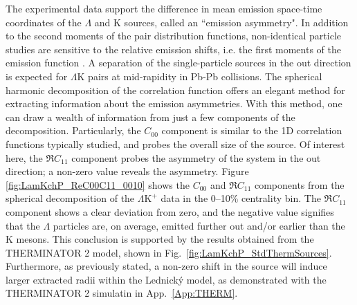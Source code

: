 \documentclass[ALICE,manyauthors]{cernphprep}
\newcommand{\Lam}{$\Lambda$\xspace}
\newcommand{\LamK}{$\Lambda$K\xspace}
\newcommand{\LamKchP}{$\Lambda\mathrm{K^{+}}$\xspace}
\begin{document}
{{The experimental data support the difference in mean emission space-time coordinates of the \Lam and K sources, called an ``emission asymmetry".
In addition to the second moments of the pair distribution functions, non-identical particle studies are sensitive to the relative emission shifts, i.e. the first moments of the emission function \cite{Kisiel:2009eh}.
A separation of the single-particle sources in the out direction is expected for \LamK pairs at mid-rapidity in Pb-Pb collisions.
The spherical harmonic decomposition of the correlation function offers an elegant method for extracting information about the emission asymmetries.
With this method, one can draw a wealth of information from just a few components of the decomposition.
Particularly, the $C_{00}$ component is similar to the 1D correlation functions typically studied, and probes the overall size of the source.
Of interest here, the $\Re C_{11}$ component probes the asymmetry of the system in the out direction; a non-zero value reveals the asymmetry. 
Figure \ref{fig:LamKchP_ReC00C11_0010} shows the $C_{00}$ and $\Re C_{11}$ components from the spherical decomposition of the \LamKchP data in the 0--10\% centrality bin.
The $\Re C_{11}$ component shows a clear deviation from zero, and the negative value signifies that the \Lam particles are, on average, emitted further out and/or earlier than the K mesons.
This conclusion is supported by the results obtained from the THERMINATOR 2 model, shown in Fig.\ \ref{fig:LamKchP_StdThermSources}.
Furthermore, as previously stated, a non-zero shift in the source will induce larger extracted radii within the Lednick\'y model, as demonstrated with the THERMINATOR 2 simulatin in App.\ \ref{App:THERM}.
}}
\end{document}
